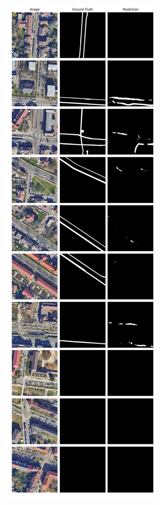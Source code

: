 	\begin{figure}
	\centering
	\begin{subfigure}{.4\textwidth}
		\centering
		\includegraphics[width=1.\textwidth]{Bilder/Samples-KA/dbunet-l.png} 

\end{subfigure}
\end{figure}
